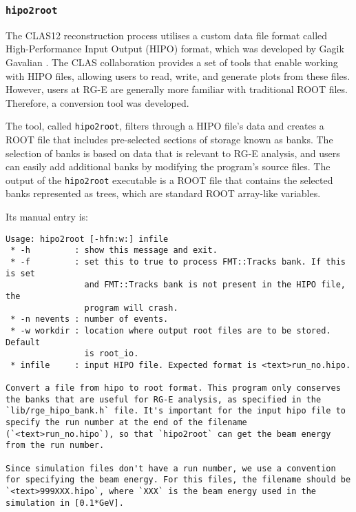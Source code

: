 \subsubsection{\texttt{hipo2root}}
\label{sssec::hipo2root}
    The CLAS12 reconstruction process utilises a custom data file format called High-Performance Input Output (HIPO) format, which was developed by Gagik Gavalian \cite{chekanov2021}.
    The CLAS collaboration provides a set of tools that enable working with HIPO files, allowing users to read, write, and generate plots from these files.
    However, users at RG-E are generally more familiar with traditional ROOT files. Therefore, a conversion tool was developed.

    The tool, called \texttt{hipo2root}, filters through a HIPO file's data and creates a ROOT file that includes pre-selected sections of storage known as banks.
    The selection of banks is based on data that is relevant to RG-E analysis, and users can easily add additional banks by modifying the program's source files.
    The output of the \texttt{hipo2root} executable is a ROOT file that contains the selected banks represented as trees, which are standard ROOT array-like variables.

    Its manual entry is:
    \begin{lstlisting}
Usage: hipo2root [-hfn:w:] infile
 * -h         : show this message and exit.
 * -f         : set this to true to process FMT::Tracks bank. If this is set
                and FMT::Tracks bank is not present in the HIPO file, the
                program will crash.
 * -n nevents : number of events.
 * -w workdir : location where output root files are to be stored. Default
                is root_io.
 * infile     : input HIPO file. Expected format is <text>run_no.hipo.

Convert a file from hipo to root format. This program only conserves the banks that are useful for RG-E analysis, as specified in the `lib/rge_hipo_bank.h` file. It's important for the input hipo file to specify the run number at the end of the filename (`<text>run_no.hipo`), so that `hipo2root` can get the beam energy from the run number.

Since simulation files don't have a run number, we use a convention for specifying the beam energy. For this files, the filename should be `<text>999XXX.hipo`, where `XXX` is the beam energy used in the simulation in [0.1*GeV].
    \end{lstlisting}
